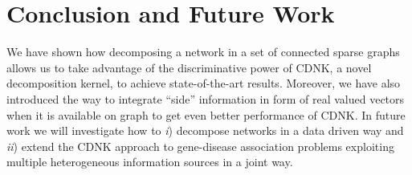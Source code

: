\documentclass[review]{elsarticle}
\begin{document}
\section{Conclusion and Future Work}
We have shown how decomposing a network in a set of connected sparse graphs allows us to take advantage of the discriminative power of CDNK, a novel decomposition kernel, to achieve state-of-the-art results. Moreover, we have also introduced the way to integrate ``side'' information in form of real valued vectors when it is available on graph to get even better performance of CDNK. In future work we will investigate how to \textit{i}) decompose networks in a data driven way and \textit{ii}) extend the CDNK approach to gene-disease association problems exploiting multiple heterogeneous information sources in a joint way.
\end{document}
